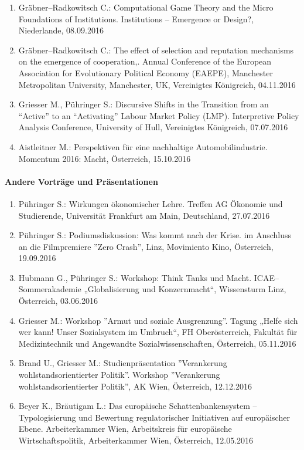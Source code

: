 \begin{enumerate}
	\item Gräbner--Radkowitsch C.: Computational Game Theory and the Micro Foundations of Institutions. Institutions -- Emergence or Design?, Niederlande, 08.09.2016
	\item Gräbner--Radkowitsch C.: The effect of selection and reputation mechanisms on the emergence of cooperation,. Annual Conference of the European Association for Evolutionary Political Economy (EAEPE), Manchester Metropolitan University, Manchester, UK, Vereinigtes Königreich, 04.11.2016
	\item Griesser M., Pühringer S.: Discursive Shifts in the Transition from an “Active” to an “Activating” Labour Market Policy (LMP). Interpretive Policy Analysis Conference, University of Hull, Vereinigtes Königreich, 07.07.2016
	\item Aistleitner M.: Perspektiven für eine nachhaltige Automobilindustrie. Momentum 2016: Macht, Österreich, 15.10.2016
\end{enumerate}
\paragraph{Andere Vorträge und Präsentationen}
\begin{enumerate}
	\item Pühringer S.: Wirkungen ökonomischer Lehre. Treffen AG Ökonomie und Studierende, Universität Frankfurt am Main, Deutschland, 27.07.2016
	\item Pühringer S.: Podiumsdiskussion: Was kommt nach der Krise. im Anschluss an die Filmpremiere ''Zero Crash'', Linz, Movimiento Kino, Österreich, 19.09.2016
	\item Hubmann G., Pühringer S.: Workshop: Think Tanks und Macht. ICAE--Sommerakademie „Globalisierung und Konzernmacht“, Wissensturm Linz, Österreich, 03.06.2016
	\item Griesser M.: Workshop ''Armut und soziale Ausgrenzung''. Tagung „Helfe sich wer kann! Unser Sozialsystem im Umbruch“, FH Oberösterreich, Fakultät für Medizintechnik und Angewandte Sozialwissenschaften, Österreich, 05.11.2016
	\item Brand U., Griesser M.: Studienpräsentation ''Verankerung wohlstandsorientierter Politik''. Workshop ''Verankerung wohlstandsorientierter Politik'', AK Wien, Österreich, 12.12.2016
	\item Beyer K., Bräutigam L.: Das europäische Schattenbankensystem – Typologisierung und Bewertung regulatorischer Initiativen auf europäischer Ebene. Arbeiterkammer Wien, Arbeitskreis für europäische Wirtschaftspolitik, Arbeiterkammer Wien, Österreich, 12.05.2016
\end{enumerate}
